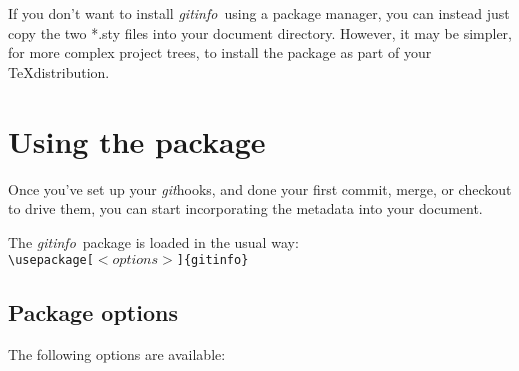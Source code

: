 \documentclass[a4paper,12pt,twoside,openany]{memoir}
\newcommand{\sfit}[1]{\textit{#1}}
\newcommand{\git}{\sfit{git}}
\newcommand{\tpname}{\sfit{gitinfo}}
\begin{document}
If you don't want to install \tpname\ using a package manager,
you can instead just copy the two *.sty files into your document directory.
However, it may be simpler, for more complex project trees, 
to install the package as part of your \TeX distribution.

\chapter{Using the package}
\label{ch:using}
Once you've set up your \git hooks, and done your first commit,
merge, or checkout to drive them,
you can start incorporating the metadata into your document.

The \tpname\ package is loaded in the usual way:\\[0.5\baselineskip]
\texttt{\textbackslash usepackage[$<options>$]\{gitinfo\}}

\section{Package options}

The following options are available:\\[0.5\baselineskip]
\end{document}
